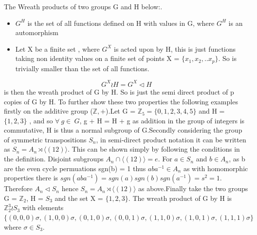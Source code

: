 \documentclass{article}
\begin{document}
The Wreath products of two groups G and H below:.
\begin{itemize}
	\item $G^{H}$ is the set of all functions defined on H with values in G, where $G^{H}$ is an automorphism 
    \item Let X be a finite set , where $G^{X}$ is acted upon by H, this is just functions taking non identity values on a finite set of points X = $\{x_{1},x_{2},.. x_{p}\}$. So is trivially smaller than the set of all functions.
\end{itemize}
\begin{equation}
	G^{X} \wr  H = G^{X} \triangleleft H
\end{equation}
is then the wreath product of G by H. So is just the semi direct product of p copies of G by H\cite{Wreath}.
To further show these two properties the following examples firstly on the additive group ($\mathbb{Z},+$).\newline Let G = $\mathbb{Z}_{5} = \{0,1,2,3,4,5\}$ and H = $\{1,2,3\}$ , and so $\forall\ g \in\ G$, g + H = H + g as addition in the group of integers is commutative, H is thus a normal subgroup of G.\newline Secondly considering the group of symmetric transpositions $S_{n}$, in semi-direct product notation it can be written as $S_{n} = A_{n} \rtimes \langle(12)\rangle$. This can be shown simply by following the conditions in the definition. Disjoint subgroups $A_{n} \cap \langle(12)\rangle = e$. For $a \in S_{n}$ and $b \in A_{n}$, as b are the even cycle permuations sgn(b) = 1 thus $aba^{-1} \in A_{n}$ as with homomorphic properties there is $sgn(aba^{-1}) = sgn(a)sgn(b)sgn(a^{-1}) = s^{2} = 1$. Therefore $A_{n} \triangleleft S_{n}$ hence $S_{n} = A_{n} \rtimes \langle(12)\rangle$ as above.\newline Finally take the two groups G = $\mathbb{Z}_{2}$, H = $S_3$ and the set X = $\{1,2,3\}$. The wreath product of G by H is $\mathbb{Z}_{2}^{3} \wr S_3$ with elements $\{(0,0,0)\sigma,(1,0,0)\sigma,(0,1,0)\sigma,(0,0,1)\sigma,(1,1,0)\sigma,(1,0,1)\sigma,(1,1,1)\sigma\}$ where $\sigma \in S_3$.
\end{document}
